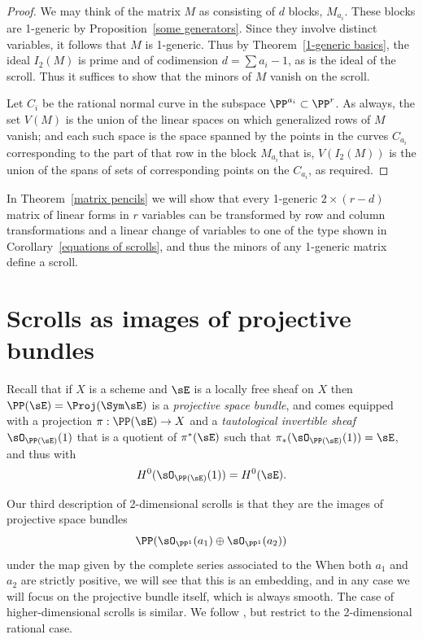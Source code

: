 \begin{proof} We may think of the matrix $M$ as consisting of $d$
blocks, $M_{a_{i}}$. These blocks are 1-generic by Proposition~\ref{some
generators}. Since they involve distinct variables, it follows that $M$
is 1-generic. Thus by
Theorem~\ref{1-generic basics}, the ideal $I_{2}(M)$ is prime and of
codimension $d = \sum a_{i}-1$, as is the ideal of the scroll. Thus it
suffices to show that the minors of $M$ vanish on the scroll.

Let $C_{i}$ be the rational normal curve in the subspace
$\PP^{a_{i}}\subset\PP^{r}$.
As always, the set $V(M)$ is the union of the linear spaces on which
generalized rows of $M$ vanish; and each such space is the space spanned
by the points in the curves $C_{a_{i}}$ corresponding to the part of that
row in the block $M_{a_{i}}$\emdash that is, $V(I_{2}(M))$ is the union of
the spans of sets of corresponding points on the $C_{a_{i}}$, as required.
\end{proof}

In Theorem~\ref{matrix pencils} we will show that every
1-generic $2 \times (r-d)$ matrix of linear forms in $r$ variables can
be transformed by row and column transformations and a linear change
of variables to one of the type shown in
Corollary~\ref{equations of scrolls}, and thus the minors of any 1-generic
matrix define a scroll.

\section{Scrolls as images of projective bundles}\label{inscrutable name}

Recall that if $X$ is a scheme and $\sE$ is a locally free sheaf on
$X$ then $\PP(\sE) = \Proj(\Sym \sE)$ is a 
%
\emph{projective space bundle}, 
%
%
and comes equipped with a projection $\pi: \PP(\sE) \to X$
and a \emph{tautological invertible sheaf} $\sO_{\PP(\sE)}(1)$ that is
%
a quotient of $\pi^{*}(\sE)$ such that $\pi_{*}(\sO_{\PP(\sE)}(1)) =
\sE$, and thus with
$$
H^{0}(\sO_{\PP(\sE)}(1)) = H^{0}(\sE).
$$

Our third description of 2-dimensional scrolls is that they are the
images of projective space bundles
$$
\PP(\sO_{\PP^{1}}(a_{1})\oplus \sO_{\PP^{1}}(a_{2}))
$$
under the map given by the complete series associated to the 
%
When both $a_{1}$ and $a_{2}$ are strictly positive,
we will see that this is an embedding, and in any case we will focus
on the projective bundle itself, which is always smooth. The case
of higher-dimensional scrolls is similar. We follow  
\cite[Chapter V]{Hartshorne1977}, but restrict
to the 2-dimensional rational case.

